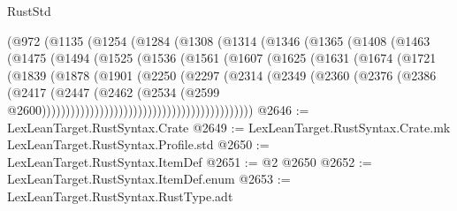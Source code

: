\begin{lexlean}{RustStd}
\begin{coremodule}
                      (@972
                        (@1135
                          (@1254
                            (@1284
                              (@1308
                                (@1314
                                  (@1346
                                    (@1365
                                      (@1408
                                        (@1463
                                          (@1475
                                            (@1494
                                              (@1525
                                                (@1536
                                                  (@1561
                                                    (@1607
                                                      (@1625
                                                        (@1631
                                                          (@1674
                                                            (@1721
                                                              (@1839
                                                                (@1878
                                                                  (@1901
                                                                    (@2250
                                                                      (@2297
                                                                        (@2314
                                                                          (@2349
                                                                            (@2360
                                                                              (@2376
                                                                                (@2386
                                                                                  (@2417
                                                                                    (@2447
                                                                                      (@2462
                                                                                        (@2534
                                                                                          (@2599
                                                                                            @2600))))))))))))))))))))))))))))))))))))))))))))
@2646 := LexLeanTarget.RustSyntax.Crate
@2649 := LexLeanTarget.RustSyntax.Crate.mk LexLeanTarget.RustSyntax.Profile.std
@2650 := LexLeanTarget.RustSyntax.ItemDef
@2651 := @2 @2650
@2652 := LexLeanTarget.RustSyntax.ItemDef.enum
@2653 := LexLeanTarget.RustSyntax.RustType.adt

\end{coremodule}
\end{lexlean}

